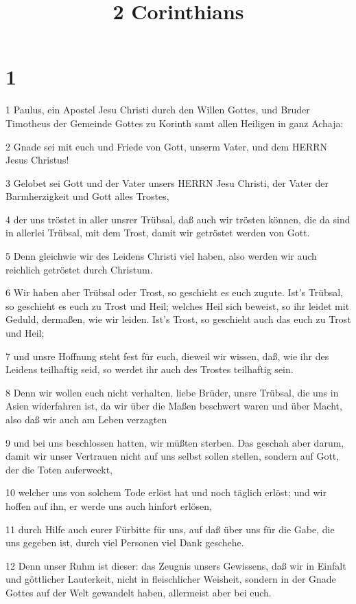 

\title{2 Corinthians}


\chapter{1}

\par 1 Paulus, ein Apostel Jesu Christi durch den Willen Gottes, und Bruder Timotheus der Gemeinde Gottes zu Korinth samt allen Heiligen in ganz Achaja:
\par 2 Gnade sei mit euch und Friede von Gott, unserm Vater, und dem HERRN Jesus Christus!
\par 3 Gelobet sei Gott und der Vater unsers HERRN Jesu Christi, der Vater der Barmherzigkeit und Gott alles Trostes,
\par 4 der uns tröstet in aller unsrer Trübsal, daß auch wir trösten können, die da sind in allerlei Trübsal, mit dem Trost, damit wir getröstet werden von Gott.
\par 5 Denn gleichwie wir des Leidens Christi viel haben, also werden wir auch reichlich getröstet durch Christum.
\par 6 Wir haben aber Trübsal oder Trost, so geschieht es euch zugute. Ist's Trübsal, so geschieht es euch zu Trost und Heil; welches Heil sich beweist, so ihr leidet mit Geduld, dermaßen, wie wir leiden. Ist's Trost, so geschieht auch das euch zu Trost und Heil;
\par 7 und unsre Hoffnung steht fest für euch, dieweil wir wissen, daß, wie ihr des Leidens teilhaftig seid, so werdet ihr auch des Trostes teilhaftig sein.
\par 8 Denn wir wollen euch nicht verhalten, liebe Brüder, unsre Trübsal, die uns in Asien widerfahren ist, da wir über die Maßen beschwert waren und über Macht, also daß wir auch am Leben verzagten
\par 9 und bei uns beschlossen hatten, wir müßten sterben. Das geschah aber darum, damit wir unser Vertrauen nicht auf uns selbst sollen stellen, sondern auf Gott, der die Toten auferweckt,
\par 10 welcher uns von solchem Tode erlöst hat und noch täglich erlöst; und wir hoffen auf ihn, er werde uns auch hinfort erlösen,
\par 11 durch Hilfe auch eurer Fürbitte für uns, auf daß über uns für die Gabe, die uns gegeben ist, durch viel Personen viel Dank geschehe.
\par 12 Denn unser Ruhm ist dieser: das Zeugnis unsers Gewissens, daß wir in Einfalt und göttlicher Lauterkeit, nicht in fleischlicher Weisheit, sondern in der Gnade Gottes auf der Welt gewandelt haben, allermeist aber bei euch.
